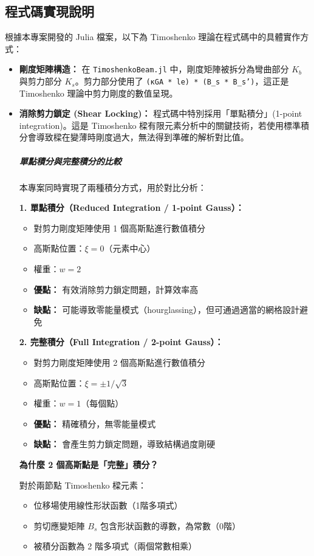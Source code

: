 \documentclass[UTF8, a4paper, 12pt]{ctexart}
\begin{document}
\subsection{ 程式碼實現說明}

根據本專案開發的 Julia 檔案，以下為 Timoshenko 理論在程式碼中的具體實作方式：

\begin{itemize}
  \item \textbf{剛度矩陣構造：}
  在 \texttt{TimoshenkoBeam.jl} 中，剛度矩陣被拆分為彎曲部分 $K_b$ 與剪力部分 $K_s$。剪力部分使用了 \texttt{(κGA * le) * (B\_s * B\_s')}，這正是 Timoshenko 理論中剪力剛度的數值呈現。
  
  \item \textbf{消除剪力鎖定 (Shear Locking)：}
  程式碼中特別採用「單點積分」(1-point integration)。這是 Timoshenko 樑有限元素分析中的關鍵技術，若使用標準積分會導致樑在變薄時剛度過大，無法得到準確的解析對比值。

\subparagraph{單點積分與完整積分的比較}

本專案同時實現了兩種積分方式，用於對比分析：

\textbf{1. 單點積分（Reduced Integration / 1-point Gauss）：}
\begin{itemize}
  \item 對剪力剛度矩陣使用 1 個高斯點進行數值積分
  \item 高斯點位置：$\xi = 0$（元素中心）
  \item 權重：$w = 2$
  \item \textbf{優點：} 有效消除剪力鎖定問題，計算效率高
  \item \textbf{缺點：} 可能導致零能量模式（hourglassing），但可通過適當的網格設計避免
\end{itemize}

\textbf{2. 完整積分（Full Integration / 2-point Gauss）：}
\begin{itemize}
  \item 對剪力剛度矩陣使用 2 個高斯點進行數值積分
  \item 高斯點位置：$\xi = \pm 1/\sqrt{3}$
  \item 權重：$w = 1$（每個點）
  \item \textbf{優點：} 精確積分，無零能量模式
  \item \textbf{缺點：} 會產生剪力鎖定問題，導致結構過度剛硬
\end{itemize}

\textbf{為什麼 2 個高斯點是「完整」積分？}

對於兩節點 Timoshenko 樑元素：
\begin{itemize}
  \item 位移場使用線性形狀函數（1階多項式）
  \item 剪切應變矩陣 $B_s$ 包含形狀函數的導數，為常數（0階）
  \item 被積分函數為 2 階多項式（兩個常數相乘）
\end{itemize}


\end{itemize}
\end{document}
